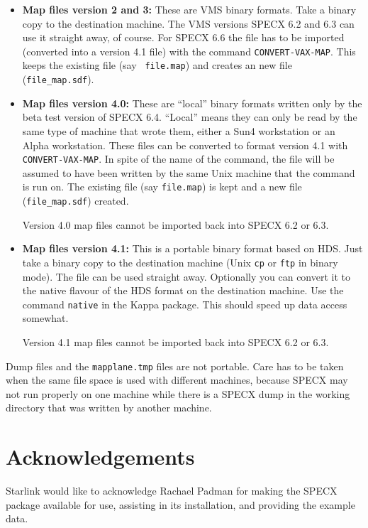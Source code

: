 \begin{itemize}
\item {\bf Map files version 2 and 3:}
    These are VMS binary formats. Take a binary
    copy to the destination machine. The VMS versions SPECX 6.2 and 6.3
    can use it straight away, of course. For SPECX 6.6 the file has to
    be imported (converted into a version 4.1 file) with the command
    {\tt CONVERT-VAX-MAP}. This keeps the existing file (say {\tt
    file.map}) and creates an new file ({\tt file\_map.sdf}).

\item {\bf Map files version 4.0:}
    These are ``local'' binary formats written only by
    the beta test version of SPECX 6.4. ``Local'' means they can only be
    read by the same type of machine that wrote them, either a Sun4
    workstation or an Alpha workstation. These files can be converted to
    format version 4.1 with {\tt CONVERT-VAX-MAP}. In spite of the name of the
    command, the file will be assumed to have been written by the same
    Unix machine that the command is run on. The existing file (say
    {\tt file.map}) is kept and a new file ({\tt file\_map.sdf}) created.

    Version 4.0 map files cannot be imported back into SPECX 6.2 or 6.3.

\item {\bf Map files version 4.1:}
    This is a portable binary format based on HDS.
    Just take a binary copy to the destination machine (Unix {\tt cp} or
    {\tt ftp} in binary mode). The file can be used straight away.
    Optionally you can convert it to the native flavour of the HDS
    format on the destination machine. Use the command {\tt native} in the
    Kappa package. This should speed up data access somewhat.

    Version 4.1 map files cannot be imported back into SPECX 6.2 or 6.3.
\end{itemize}

Dump files and the {\tt mapplane.tmp} files are not portable. Care has to
be taken when the same file space is used with different machines,
because SPECX may not run properly on one machine while there is a SPECX
dump in the working directory that was written by another machine.


\section{Acknowledgements}

Starlink would like to acknowledge Rachael Padman for making
the SPECX package available for use, assisting in its installation,
and providing the example data.



